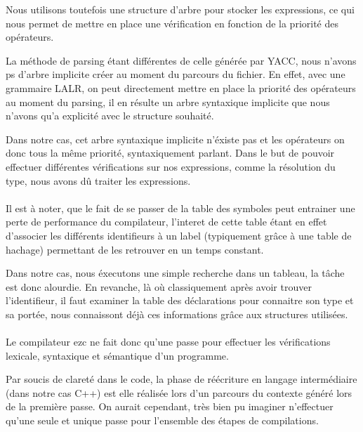 Nous utilisons toutefois une structure d'arbre pour stocker les expressions, ce qui nous permet 
de mettre en place une vérification en fonction de la priorité des opérateurs.

La méthode de parsing étant différentes de celle générée par YACC, nous n'avons ps d'arbre
implicite créer au moment du parcours du fichier. En effet, avec une grammaire LALR, on peut directement
mettre en place la priorité des opérateurs au moment du parsing, il en résulte un arbre syntaxique
implicite que nous n'avons qu'a explicité avec le structure souhaité.

Dans notre cas, cet arbre syntaxique implicite n'éxiste pas et les opérateurs on donc tous la même priorité,
syntaxiquement parlant. Dans le but de pouvoir effectuer différentes vérifications sur nos expressions, comme la résolution
du type, nous avons dû traiter les expressions.


\paragraph{}Il est à noter, que le fait de se passer de la table des symboles peut entrainer 
une perte de performance du compilateur, l'interet de cette table étant en effet d'associer les 
différents identifieurs à un label (typiquement grâce à une table de hachage) permettant de les 
retrouver en un temps constant.

Dans notre cas, nous éxecutons une simple recherche dans un tableau,
la tâche est donc alourdie. En revanche, là où classiquement après avoir trouver l'identifieur, 
il faut examiner la table des déclarations pour connaitre son type et sa portée, 
nous connaissont déjà ces informations grâce aux structures utilisées.

\paragraph{}Le compilateur ezc ne fait donc qu'une passe pour effectuer les vérifications lexicale, 
syntaxique et sémantique d'un programme.

Par soucis de clareté dans le code, la phase de réécriture en langage intermédiaire (dans notre cas C++)
est elle réalisée lors d'un parcours du contexte généré lors de la première passe. On aurait cependant, très bien
pu imaginer n'effectuer qu'une seule et unique passe pour l'ensemble des étapes de compilations.


